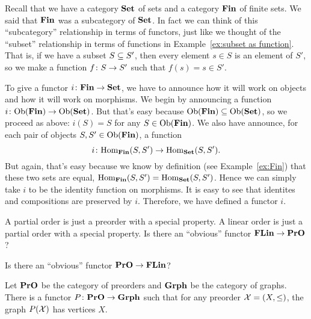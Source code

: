 \documentclass[CT4S-EN-RU]{subfiles}
\begin{document}
\begin{exampleENG}
Recall that we have a category $\Set$ of sets and a category $\Fin$ of finite sets. We said that $\Fin$ was a subcategory of $\Set$. In fact we can think of this “subcategory” relationship in terms of functors, just like we thought of the “subset” relationship in terms of functions in Example~\ref{ex:subset as function}. That is, if we have a subset $S\ss S'$, then every element $s\in S$ is an element of $S'$, so we make a function $f\taking S\to S'$ such that $f(s)=s\in S'$. 

To give a functor $i\taking\Fin\to\Set$, we have to announce how it will work on objects and how it will work on morphisms. We begin by announcing a function $i\taking\Ob(\Fin)\to\Ob(\Set)$. But that's easy because $\Ob(\Fin)\ss\Ob(\Set)$, so we proceed as above: $i(S)=S$ for any $S\in\Ob(\Fin)$. We also have announce, for each pair of objects $S,S'\in\Ob(\Fin)$, a function $$i\taking\Hom_\Fin(S,S')\to\Hom_\Set(S,S').$$ But again, that's easy because we know by definition (see Example~\ref{ex:Fin}) that these two sets are equal, $\Hom_\Fin(S,S')=\Hom_\Set(S,S')$. Hence we can simply take $i$ to be the identity function on morphisms. It is easy to see that identites and compositions are preserved by $i$. Therefore, we have defined a functor $i$.
\end{exampleENG}

\begin{exampleRUS}
\end{exampleRUS}

\begin{exerciseENG}
A partial order is just a preorder with a special property. A linear order is just a partial order with a special property.
\sexc Is there an “obvious” functor $\FLin\to\PrO$?
\item Is there an “obvious” functor $\PrO\to\FLin$?
\endsexc
\end{exerciseENG}

\begin{exerciseRUS}
\end{exerciseRUS}

\begin{propositionENG}\label{prop:pro to grph}
Let $\PrO$ be the category of preorders and $\Grph$ be the category of graphs. There is a functor $P\taking\PrO\to\Grph$ such that for any preorder $\mcX=(X,\leq)$, the graph $P(\mcX)$ has vertices $X$.
\end{propositionENG}
\end{document}
